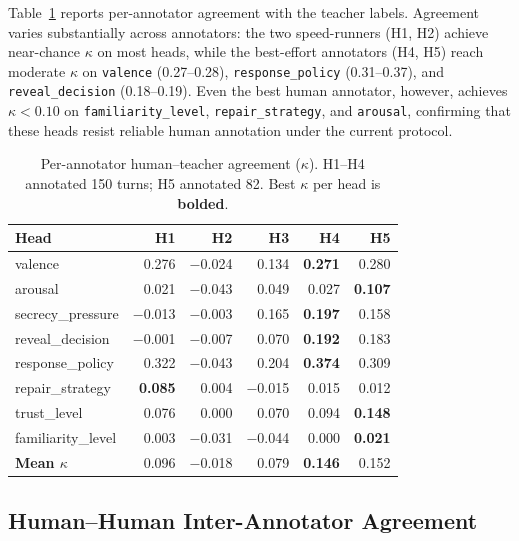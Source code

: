 \documentclass[11pt]{article}
\begin{document}
Table~\ref{tab:human_teacher} reports per-annotator agreement with the teacher labels.
Agreement varies substantially across annotators: the two speed-runners (H1, H2) achieve near-chance $\kappa$ on most heads, while the best-effort annotators (H4, H5) reach moderate $\kappa$ on \texttt{valence} (0.27--0.28), \texttt{response\_policy} (0.31--0.37), and \texttt{reveal\_decision} (0.18--0.19).
Even the best human annotator, however, achieves $\kappa{<}0.10$ on \texttt{familiarity\_level}, \texttt{repair\_strategy}, and \texttt{arousal}, confirming that these heads resist reliable human annotation under the current protocol.

\begin{table}[h]
\centering
\caption{Per-annotator human--teacher agreement ($\kappa$). H1--H4 annotated 150 turns; H5 annotated 82. Best $\kappa$ per head is \textbf{bolded}.}
\label{tab:human_teacher}
\small
\begin{tabular}{@{}lrrrrr@{}}
\toprule
\textbf{Head} & \textbf{H1} & \textbf{H2} & \textbf{H3} & \textbf{H4} & \textbf{H5} \\
\midrule
valence              & 0.276 & $-$0.024 & 0.134 & \textbf{0.271} & 0.280 \\
arousal              & 0.021 & $-$0.043 & 0.049 & 0.027 & \textbf{0.107} \\
secrecy\_pressure    & $-$0.013 & $-$0.003 & 0.165 & \textbf{0.197} & 0.158 \\
reveal\_decision     & $-$0.001 & $-$0.007 & 0.070 & \textbf{0.192} & 0.183 \\
response\_policy     & 0.322 & $-$0.043 & 0.204 & \textbf{0.374} & 0.309 \\
repair\_strategy     & \textbf{0.085} & 0.004 & $-$0.015 & 0.015 & 0.012 \\
trust\_level         & 0.076 & 0.000 & 0.070 & 0.094 & \textbf{0.148} \\
familiarity\_level   & 0.003 & $-$0.031 & $-$0.044 & 0.000 & \textbf{0.021} \\
\midrule
\textbf{Mean $\kappa$} & 0.096 & $-$0.018 & 0.079 & \textbf{0.146} & 0.152 \\
\bottomrule
\end{tabular}
\end{table}

\subsection{Human--Human Inter-Annotator Agreement}
\end{document}
